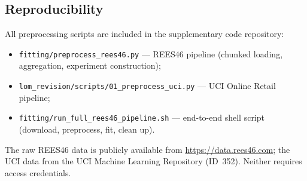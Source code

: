 \subsection{Reproducibility}

All preprocessing scripts are included in the supplementary
code repository:
\begin{itemize}[leftmargin=*]
  \item \texttt{fitting/preprocess\_rees46.py} --- REES46 pipeline
        (chunked loading, aggregation, experiment construction);
  \item \texttt{lom\_revision/scripts/01\_preprocess\_uci.py} ---
        UCI Online Retail pipeline;
  \item \texttt{fitting/run\_full\_rees46\_pipeline.sh} ---
        end-to-end shell script (download, preprocess, fit, clean up).
\end{itemize}
The raw REES46 data is publicly available from
\url{https://data.rees46.com}; the UCI data from the
UCI Machine Learning Repository (ID~352).
Neither requires access credentials.

